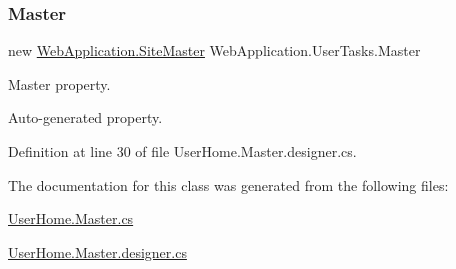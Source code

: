 \subsubsection{\texorpdfstring{Master}{Master}}
{\footnotesize\ttfamily new \mbox{\hyperlink{classWebApplication_1_1SiteMaster}{Web\+Application.\+Site\+Master}} Web\+Application.\+User\+Tasks.\+Master\hspace{0.3cm}{\ttfamily [get]}}



Master property. 

Auto-\/generated property. 

Definition at line 30 of file User\+Home.\+Master.\+designer.\+cs.



The documentation for this class was generated from the following files\+:\begin{DoxyCompactItemize}
\item 
\mbox{\hyperlink{UserHome_8Master_8cs}{User\+Home.\+Master.\+cs}}\item 
\mbox{\hyperlink{UserHome_8Master_8designer_8cs}{User\+Home.\+Master.\+designer.\+cs}}\end{DoxyCompactItemize}
